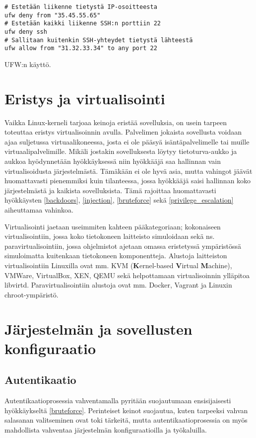 \begin{algorithm}[tbh]
\begin{verbatim}
# Estetään liikenne tietystä IP-osoitteesta
ufw deny from "35.45.55.65"
# Estetään kaikki liikenne SSH:n porttiin 22
ufw deny ssh
# Sallitaan kuitenkin SSH-yhteydet tietystä lähteestä
ufw allow from "31.32.33.34" to any port 22
\end{verbatim}
\caption{UFW:n käyttö.\label{alg:ufw}}
\end{algorithm}


\section{Eristys ja virtualisointi}\label{eristys_ja_virtualisointi}
Vaikka Linux-kerneli tarjoaa keinoja eristää sovelluksia, on usein tarpeen toteuttaa eristys virtualisoinnin avulla. Palvelimen jokaista sovellusta voidaan ajaa suljetussa virtuaalikoneessa, josta ei ole pääsyä isäntäpalvelimelle tai muille virtuaalipalvelimille. Mikäli jostakin sovelluksesta löytyy tietoturva-aukko ja aukkoa hyödynnetään hyökkäyksessä niin hyökkääjä saa hallinnan vain virtualisoidusta järjestelmästä. Tämäkään ei ole hyvä asia, mutta vahingot jäävät huomattavasti pienemmiksi kuin tilanteessa, jossa hyökkääjä saisi hallinnan koko järjestelmästä ja kaikista sovelluksista. Tämä rajoittaa huomattavasti hyökkäysten \ref{backdoors}, \ref{injection}, \ref{bruteforce} sekä \ref{privilege_escalation} aiheuttamaa vahinkoa.~\cite{portnoy2016virtualization}

Virtualisointi jaetaan useimmiten kahteen pääkategoriaan; kokonaiseen virtualisointiin, jossa koko tietokoneen laitteisto simuloidaan sekä ns. paravirtualisointiin, jossa ohjelmistot ajetaan omassa eristetyssä ympäristössä simuloimatta kuitenkaan tietokoneen komponentteja.
Alustoja laitteiston virtualisointiin Linuxilla ovat mm. KVM (\textbf{K}ernel-based \textbf{V}irtual \textbf{M}achine), VMWare, VirtualBox, XEN, QEMU sekä helpottamaan virtualisoinnin ylläpitoa libvirtd.
Paravirtualisointiin alustoja ovat mm. Docker, Vagrant ja Linuxin chroot-ympäristö.~\cite{portnoy2016virtualization}

\section{Järjestelmän ja sovellusten konfiguraatio}\label{sovellusten_konfiguraatio}

\subsection{Autentikaatio}\label{autentikaatio}
Autentikaatioprosessia vahventamalla pyritään suojautumaan ensisijaisesti hyökkäykseltä \ref{bruteforce}. Perinteiset keinot suojautua, kuten tarpeeksi vahvan salasanan valitseminen ovat toki tärkeitä, mutta autentikaatioprosessia on myös mahdollista vahventaa järjestelmän konfiguraatioilla ja työkaluilla.

